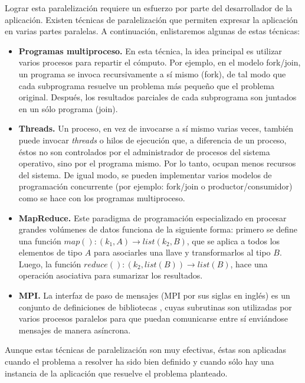 Lograr esta paralelización requiere un esfuerzo por parte del desarrollador de la aplicación. Existen técnicas de paralelización que permiten expresar la aplicación en varias partes paralelas. A continuación, enlistaremos algunas de estas técnicas:

\begin{itemize}
\item{\textbf{Programas multiproceso.} En esta técnica, la idea principal es utilizar varios procesos para repartir el cómputo. Por ejemplo, en el modelo fork/join, un programa se invoca recursivamente a sí mismo (fork), de tal modo que cada subprograma resuelve un problema más pequeño que el problema original. Después, los resultados parciales de cada subprograma son juntados en un sólo programa (join).}

\item{\textbf{Threads.} Un proceso, en vez de invocarse a sí mismo varias veces, también puede invocar \emph{threads} o hilos de ejecución que, a diferencia de un proceso, éstos no son controlados por el administrador de procesos del sistema operativo, sino por el programa mismo. Por lo tanto, ocupan menos recursos del sistema. De igual modo, se pueden implementar varios modelos de programación concurrente (por ejemplo: fork/join o productor/consumidor) como se hace con los programas multiproceso.}

\item{\textbf{MapReduce.} Este paradigma de programación especializado en procesar grandes volúmenes de datos \cite{dean2008mapreduce} funciona de la siguiente forma: primero se define una función $map(): (k_1,A) \rightarrow list(k_2,B)$, que se aplica a todos los elementos de tipo $A$ para asociarles una llave y transformarlos al tipo $B$. Luego, la función $reduce(): (k_2, list(B)) \rightarrow list(B)$, hace una operación asociativa para sumarizar los resultados.}

\item{\textbf{MPI.} La interfaz de paso de mensajes (MPI por sus siglas en inglés) es un conjunto de definiciones de bibliotecas \cite{lusk2009mpi}, cuyas subrutinas son utilizadas por varios procesos paralelos para que puedan comunicarse entre sí enviándose mensajes de manera asíncrona.}
\end{itemize}

Aunque estas técnicas de paralelización son muy efectivas, éstas son aplicadas cuando el problema a resolver ha sido bien definido y cuando sólo hay una instancia de la aplicación que resuelve el problema planteado. 

